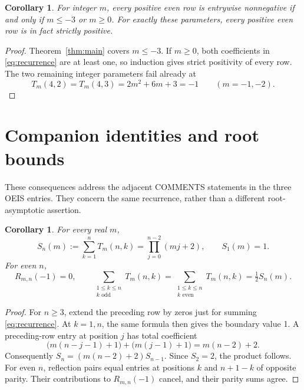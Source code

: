 \documentclass[11pt]{article}
\newtheorem{corollary}[theorem]{Corollary}
\begin{document}
\begin{corollary}\label{cor:classification}
For integer $m$, every positive even row is entrywise nonnegative
if and only if $m\leq-3$ or $m\geq0$. For exactly these parameters,
every positive even row is in fact strictly positive.
\end{corollary}
\begin{proof}
Theorem~\ref{thm:main} covers $m\leq-3$. If $m\geq0$, both
coefficients in \eqref{eq:recurrence} are at least one, so induction
gives strict positivity of every row. The two remaining integer
parameters fail already at
\[
 T_m(4,2)=T_m(4,3)=2m^2+6m+3=-1
 \qquad(m=-1,-2).
\]
\end{proof}

\section{Companion identities and root bounds}
These consequences address the adjacent COMMENTS statements in the three
OEIS entries. They concern the same recurrence, rather than a different
root-asymptotic assertion.

\begin{corollary}\label{cor:sums}
For every real $m$,
\[
 S_n(m):=\sum_{k=1}^n T_m(n,k)
 =\prod_{j=0}^{n-2}(mj+2),\qquad S_1(m)=1.
\]
For even $n$,
\[
 R_{m,n}(-1)=0,\qquad
 \sum_{\substack{1\leq k\leq n\\ k\text{ odd}}}T_m(n,k)
 =\sum_{\substack{1\leq k\leq n\\ k\text{ even}}}T_m(n,k)
 =\tfrac12 S_n(m).
\]
\end{corollary}
\begin{proof}
For $n\geq3$, extend the preceding row by zeros just for summing
\eqref{eq:recurrence}. At $k=1,n$, the same formula then gives
the boundary value 1. A preceding-row entry at position $j$
has total coefficient
\[
 \bigl(m(n-j-1)+1\bigr)+\bigl(m(j-1)+1\bigr)=m(n-2)+2.
\]
Consequently $S_n=(m(n-2)+2)S_{n-1}$. Since $S_2=2$,
the product follows. For even $n$, reflection pairs equal entries
at positions $k$ and $n+1-k$ of opposite parity. Their contributions
to $R_{m,n}(-1)$ cancel, and their parity sums agree.
\end{proof}
\end{document}
